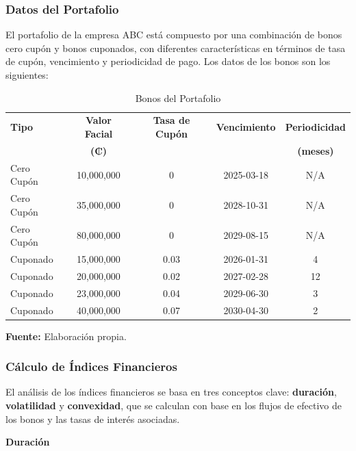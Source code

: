 \documentclass[12pt]{article}
\begin{document}
\subsubsection{Datos del Portafolio}

El portafolio de la empresa ABC está compuesto por una combinación de bonos cero cupón y bonos cuponados, con diferentes características en términos de tasa de cupón, vencimiento y periodicidad de pago. Los datos de los bonos son los siguientes:

\begin{table}[H]
\centering
\small
\caption{Bonos del Portafolio} 
\vspace{0.1cm} 
\begin{tabular}{lcccc}
\hline \hline
\textbf{Tipo} & \textbf{Valor Facial} & \textbf{Tasa de Cupón} & \textbf{Vencimiento} & \textbf{Periodicidad} \\ 
 & \textbf{(₡)} &  &  & \textbf{(meses)} \\ 
\midrule
Cero Cupón & 10,000,000  & 0     & 2025-03-18 & N/A  \\
Cero Cupón & 35,000,000  & 0     & 2028-10-31 & N/A  \\
Cero Cupón & 80,000,000  & 0     & 2029-08-15 & N/A  \\
Cuponado   & 15,000,000  & 0.03  & 2026-01-31 & 4    \\
Cuponado   & 20,000,000  & 0.02  & 2027-02-28 & 12   \\
Cuponado   & 23,000,000  & 0.04  & 2029-06-30 & 3    \\
Cuponado   & 40,000,000  & 0.07  & 2030-04-30 & 2    \\
\hline \hline
\end{tabular}
\begin{tablenotes}
	\item[] \small\textbf{Fuente:} Elaboración propia.
\end{tablenotes}
\end{table}

\subsubsection{Cálculo de Índices Financieros}

El análisis de los índices financieros se basa en tres conceptos clave: \textbf{duración}, \textbf{volatilidad} y \textbf{convexidad}, que se calculan con base en los flujos de efectivo de los bonos y las tasas de interés asociadas.

\noindent \textbf{Duración}
\end{document}

